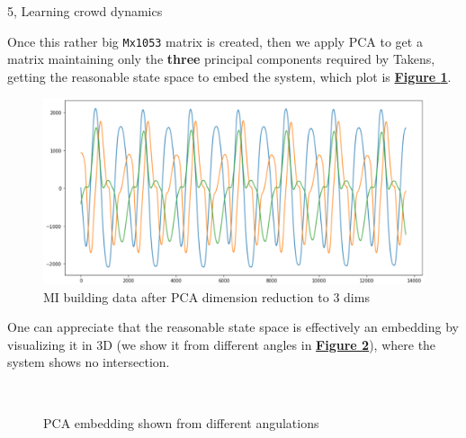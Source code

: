 \documentclass[10pt,a4paper]{article}
\begin{document}
\begin{task}{5, Learning crowd dynamics}
\begin{itemize}
\end{itemize}
Once this rather big \texttt{Mx1053} matrix is created, then we apply PCA to get a matrix maintaining only the \textbf{three} principal components required by Takens, getting the reasonable state space to embed the system, which plot is \textbf{\hyperref[fig:task5-pca-data]{Figure \ref{fig:task5-pca-data}}}.
\begin{figure}[H]
    \centering
    \includegraphics[scale=0.5]{images/task5-pca-data.png}
    \caption{MI building data after PCA dimension reduction to 3 dims}
    \label{fig:task5-pca-data}
\end{figure}

One can appreciate that the reasonable state space is effectively an embedding by visualizing it in 3D (we show it from different angles in \textbf{\hyperref[fig:pca-embedding]{Figure \ref{fig:pca-embedding}}}), where the system shows no intersection. 
\begin{figure}[ht!]
 \centering
 \\
 \caption{PCA embedding shown from different angulations}%
 \label{fig:pca-embedding}%
\end{figure}
\pagebreak

\end{task}
\end{document}
